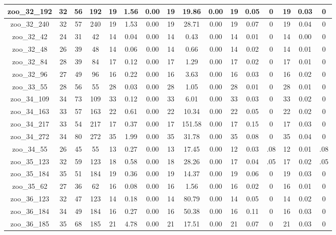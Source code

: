 \begin{landscape}
\begin{longtable}{|c|c|c|c|c|c|c|c|c|c|c|c|c|c|c|c|}
zoo\_32\_192 & 32 & 56 & 192 & 19 & 1.56 & 0.00 & 19 & 19.86 & 0.00 & 19 & 0.05 & 0 & 19 & 0.03 & 0 \\ \hline 
zoo\_32\_240 & 32 & 57 & 240 & 19 & 1.53 & 0.00 & 19 & 28.71 & 0.00 & 19 & 0.07 & 0 & 19 & 0.04 & 0 \\ \hline 
zoo\_32\_42 & 24 & 31 & 42 & 14 & 0.04 & 0.00 & 14 & 0.43 & 0.00 & 14 & 0.01 & 0 & 14 & 0.00 & 0 \\ \hline 
zoo\_32\_48 & 26 & 39 & 48 & 14 & 0.06 & 0.00 & 14 & 0.66 & 0.00 & 14 & 0.02 & 0 & 14 & 0.01 & 0 \\ \hline 
zoo\_32\_84 & 28 & 39 & 84 & 17 & 0.12 & 0.00 & 17 & 1.29 & 0.00 & 17 & 0.02 & 0 & 17 & 0.01 & 0 \\ \hline 
zoo\_32\_96 & 27 & 49 & 96 & 16 & 0.22 & 0.00 & 16 & 3.63 & 0.00 & 16 & 0.03 & 0 & 16 & 0.02 & 0 \\ \hline 
zoo\_33\_55 & 28 & 56 & 55 & 28 & 0.03 & 0.00 & 28 & 1.05 & 0.00 & 28 & 0.01 & 0 & 28 & 0.01 & 0 \\ \hline 
zoo\_34\_109 & 34 & 73 & 109 & 33 & 0.12 & 0.00 & 33 & 6.01 & 0.00 & 33 & 0.03 & 0 & 33 & 0.02 & 0 \\ \hline 
zoo\_34\_163 & 33 & 57 & 163 & 22 & 0.61 & 0.00 & 22 & 10.34 & 0.00 & 22 & 0.05 & 0 & 22 & 0.02 & 0 \\ \hline 
zoo\_34\_217 & 33 & 54 & 217 & 17 & 0.37 & 0.00 & 17 & 151.58 & 0.00 & 17 & 0.15 & 0 & 17 & 0.03 & 0 \\ \hline 
zoo\_34\_272 & 34 & 80 & 272 & 35 & 1.99 & 0.00 & 35 & 31.78 & 0.00 & 35 & 0.08 & 0 & 35 & 0.04 & 0 \\ \hline 
zoo\_34\_55 & 26 & 45 & 55 & 13 & 0.27 & 0.00 & 13 & 17.45 & 0.00 & 12 & 0.03 & .08 & 12 & 0.01 & .08 \\ \hline 
zoo\_35\_123 & 32 & 59 & 123 & 18 & 0.58 & 0.00 & 18 & 28.26 & 0.00 & 17 & 0.04 & .05 & 17 & 0.02 & .05 \\ \hline 
zoo\_35\_184 & 35 & 51 & 184 & 19 & 0.36 & 0.00 & 19 & 14.37 & 0.00 & 19 & 0.06 & 0 & 19 & 0.03 & 0 \\ \hline 
zoo\_35\_62 & 27 & 36 & 62 & 16 & 0.08 & 0.00 & 16 & 1.56 & 0.00 & 16 & 0.02 & 0 & 16 & 0.01 & 0 \\ \hline 
zoo\_36\_123 & 32 & 47 & 123 & 14 & 0.18 & 0.00 & 14 & 80.79 & 0.00 & 14 & 0.05 & 0 & 14 & 0.02 & 0 \\ \hline 
zoo\_36\_184 & 34 & 49 & 184 & 16 & 0.27 & 0.00 & 16 & 50.38 & 0.00 & 16 & 0.11 & 0 & 16 & 0.03 & 0 \\ \hline 
zoo\_36\_185 & 35 & 68 & 185 & 21 & 4.78 & 0.00 & 21 & 17.51 & 0.00 & 21 & 0.07 & 0 & 21 & 0.03 & 0 \\ \hline 

\end{longtable}
\end{landscape}
